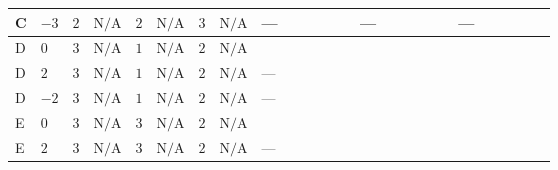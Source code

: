 \documentclass[8pt]{article}
\begin{document}
\begin{landscape}
\begin{longtable}{@{}llcccccc >{\raggedright\arraybackslash}p{0.21\linewidth} >{\raggedright\arraybackslash}p{0.21\linewidth} >{\raggedright\arraybackslash}p{0.21\linewidth}@{}}
\midrule
C & $-3$ & $2$ & $\text{N/A}$ & $2$ & $\text{N/A}$ & $3$ & $\text{N/A}$ & --- & --- & --- \\
\midrule
D & $0$ & $3$ & $\text{N/A}$ & $1$ & $\text{N/A}$ & $2$ & $\text{N/A}$ & \scriptsize\adjustbox{max width=\linewidth}{$\begin{gathered} -\frac{8}{3} {\lambda_{X_{18}}} \left({\lambda_{X_{18}}}\right)^{*}\end{gathered}$} & \scriptsize\adjustbox{max width=\linewidth}{$\begin{gathered} -2 {g_2}^4\end{gathered}$} & \scriptsize\adjustbox{max width=\linewidth}{$\begin{gathered} -24 {g_2}^2 {\lambda_{S_1}^{(A)}}\end{gathered}$} \\
\midrule
D & $2$ & $3$ & $\text{N/A}$ & $1$ & $\text{N/A}$ & $2$ & $\text{N/A}$ & --- & \scriptsize\adjustbox{max width=\linewidth}{$\begin{gathered} -2 {g_2}^4\end{gathered}$} & \scriptsize\adjustbox{max width=\linewidth}{$\begin{gathered} -24 {g_2}^2 {\lambda_{S_1}^{(A)}}\end{gathered}$} \\
\midrule
D & $-2$ & $3$ & $\text{N/A}$ & $1$ & $\text{N/A}$ & $2$ & $\text{N/A}$ & --- & \scriptsize\adjustbox{max width=\linewidth}{$\begin{gathered} -2 {g_2}^4\end{gathered}$} & \scriptsize\adjustbox{max width=\linewidth}{$\begin{gathered} -24 {g_2}^2 {\lambda_{S_1}^{(A)}}\end{gathered}$} \\
\midrule
E & $0$ & $3$ & $\text{N/A}$ & $3$ & $\text{N/A}$ & $2$ & $\text{N/A}$ & \scriptsize\adjustbox{max width=\linewidth}{$\begin{gathered} -\frac{8}{3} {\lambda_{X_{18}}} \left({\lambda_{X_{18}}}\right)^{*}\end{gathered}$} & \scriptsize\adjustbox{max width=\linewidth}{$\begin{gathered} -2 {g_2}^4\end{gathered}$} & \scriptsize\adjustbox{max width=\linewidth}{$\begin{gathered} -24 {g_2}^2 {\lambda_{S_1}^{(A)}}\end{gathered}$} \\
\midrule
E & $2$ & $3$ & $\text{N/A}$ & $3$ & $\text{N/A}$ & $2$ & $\text{N/A}$ & --- & \scriptsize\adjustbox{max width=\linewidth}{$\begin{gathered} -2 {g_2}^4\end{gathered}$} & \scriptsize\adjustbox{max width=\linewidth}{$\begin{gathered} -24 {g_2}^2 {\lambda_{S_1}^{(A)}}\end{gathered}$} \\

\end{longtable}
\end{landscape}
\end{document}
